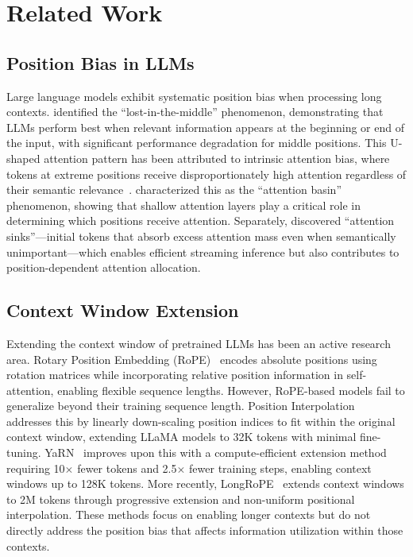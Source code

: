\section{Related Work}
\label{sec:related}

\subsection{Position Bias in LLMs}

Large language models exhibit systematic position bias when processing long contexts. \citet{Liu2023LostIT} identified the ``lost-in-the-middle'' phenomenon, demonstrating that LLMs perform best when relevant information appears at the beginning or end of the input, with significant performance degradation for middle positions. This U-shaped attention pattern has been attributed to intrinsic attention bias, where tokens at extreme positions receive disproportionately high attention regardless of their semantic relevance~\citep{Hsieh2024FoundIT}. \citet{Yi2025AttentionBW} characterized this as the ``attention basin'' phenomenon, showing that shallow attention layers play a critical role in determining which positions receive attention. Separately, \citet{Xiao2023EfficientSL} discovered ``attention sinks''---initial tokens that absorb excess attention mass even when semantically unimportant---which enables efficient streaming inference but also contributes to position-dependent attention allocation.

\subsection{Context Window Extension}

Extending the context window of pretrained LLMs has been an active research area. Rotary Position Embedding (RoPE)~\citep{Su2021RoFormerET} encodes absolute positions using rotation matrices while incorporating relative position information in self-attention, enabling flexible sequence lengths. However, RoPE-based models fail to generalize beyond their training sequence length. Position Interpolation~\citep{Chen2023ExtendingCW} addresses this by linearly down-scaling position indices to fit within the original context window, extending LLaMA models to 32K tokens with minimal fine-tuning. YaRN~\citep{Peng2023YaRNEC} improves upon this with a compute-efficient extension method requiring 10$\times$ fewer tokens and 2.5$\times$ fewer training steps, enabling context windows up to 128K tokens. More recently, LongRoPE~\citep{Ding2024LongRoPEEL} extends context windows to 2M tokens through progressive extension and non-uniform positional interpolation. These methods focus on enabling longer contexts but do not directly address the position bias that affects information utilization within those contexts.

